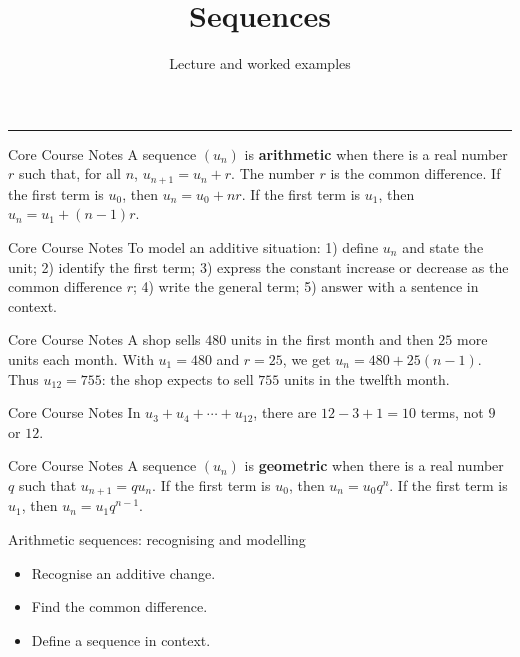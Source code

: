 \documentclass[aspectratio=169,10pt]{beamer}
\title{Sequences}
\subtitle{Lecture and worked examples}
\date{}
\author{}
\begin{document}
\begin{frame}[plain]
\vfill
{\inserttitle\par}
\medskip
{\insertsubtitle\par}
\medskip
{\rule{\textwidth}{.5pt}}
\vfill
\end{frame}
\begin{frame}{Core Course Notes}
A sequence \((u_n)\) is \textbf{arithmetic} when there is a real number \(r\) such that, for all \(n\), \(u_{n+1}=u_n+r\). The number \(r\) is the common difference. If the first term is \(u_0\), then \(u_n=u_0+nr\). If the first term is \(u_1\), then \(u_n=u_1+(n-1)r\).
\end{frame}
\begin{frame}{Core Course Notes}
To model an additive situation: 1) define \(u_n\) and state the unit; 2) identify the first term; 3) express the constant increase or decrease as the common difference \(r\); 4) write the general term; 5) answer with a sentence in context.
\end{frame}
\begin{frame}{Core Course Notes}
A shop sells \(480\) units in the first month and then \(25\) more units each month. With \(u_1=480\) and \(r=25\), we get \(u_n=480+25(n-1)\). Thus \(u_{12}=755\): the shop expects to sell \(755\) units in the twelfth month.
\end{frame}
\begin{frame}{Core Course Notes}
In \(u_3+u_4+\cdots+u_{12}\), there are \(12-3+1=10\) terms, not \(9\) or \(12\).
\end{frame}
\begin{frame}{Core Course Notes}
A sequence \((u_n)\) is \textbf{geometric} when there is a real number \(q\) such that \(u_{n+1}=q u_n\). If the first term is \(u_0\), then \(u_n=u_0q^n\). If the first term is \(u_1\), then \(u_n=u_1q^{n-1}\).
\end{frame}
\begin{frame}{Arithmetic sequences: recognising and modelling}
\begin{itemize}
\item Recognise an additive change.
\item Find the common difference.
\item Define a sequence in context.

\end{itemize}
\end{frame}
\end{document}
